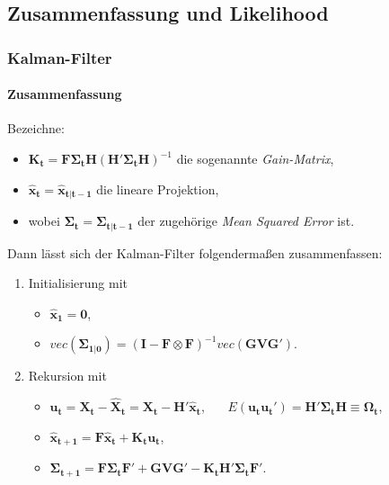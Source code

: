 \documentclass{beamer} %
\begin{document}
\subsection{Zusammenfassung und Likelihood}
\begin{frame}\frametitle{Kalman-Filter}\framesubtitle{Zusammenfassung}
Bezeichne:
\begin{itemize}
\item $\mathbf{K_t}=\mathbf{F}\boldsymbol{\Sigma_{t}} \mathbf{H} \left(\mathbf{H}'\boldsymbol{\Sigma_{t}}\mathbf{H}\right)^{-1}$ die
sogenannte \emph{Gain-Matrix},
\item $\mathbf{\widehat{x}_t}=\mathbf{\widehat{x}_{t|t-1}}$ die lineare Projektion,
\item wobei $\boldsymbol{\Sigma_t}=\boldsymbol{\Sigma_{t|t-1}}$ der zugeh\"{o}rige \emph{Mean Squared Error} ist.
\end{itemize}
Dann l\"{a}sst sich der Kalman-Filter folgenderma{\ss}en zusammenfassen:
\begin{enumerate}
  \item Initialisierung mit
  \begin{itemize}
  \item $\mathbf{\widehat{x}_1} = \mathbf{0}$,
  \item $vec(\boldsymbol{\Sigma_{1|0}}) = (\mathbf{I}-\mathbf{F}
      \otimes \mathbf{F})^{-1} vec(\mathbf{G} \mathbf{V}
      \mathbf{G}')$.
  \end{itemize}
  \item Rekursion mit
   \begin{itemize}
   \item $\mathbf{u_t} = \mathbf{X_t} -\mathbf{\widehat{X}_t}
       =\mathbf{X_t} - \mathbf{H}' \mathbf{\widehat{x}_t}$,~~~
       $E(\mathbf{u_t}
       \mathbf{u_t'})=\mathbf{H}'\boldsymbol{\Sigma_t}
       \mathbf{H}\equiv \boldsymbol{\Omega_t}$,
    \item $\mathbf{\widehat{x}_{t+1}}=\mathbf{F}
        \mathbf{\widehat{x}_{t}} + \mathbf{K_t} \mathbf{u_t}$,
    \item $\boldsymbol{\Sigma_{t+1}} = \mathbf{F}
        \boldsymbol{\Sigma_{t}} \mathbf{F'} + \mathbf{G} \mathbf{V}
        \mathbf{G}' - \mathbf{K_t} \mathbf{H}'
        \boldsymbol{\Sigma_{t}}\mathbf{F}'$.
    \end{itemize}
\end{enumerate}
\end{frame}
\end{document}
